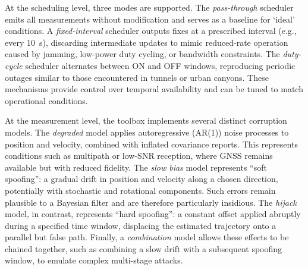 \documentclass[Afour,sageh,times]{sagej}
\begin{document}
At the scheduling level, three modes are supported. The \emph{pass-through} scheduler emits all measurements without modification and serves as a baseline for `ideal' conditions. A \emph{fixed-interval} scheduler outputs fixes at a prescribed interval (e.g., every 10~s), discarding intermediate updates to mimic reduced-rate operation caused by jamming, low-power duty cycling, or bandwidth constraints. The \emph{duty-cycle} scheduler alternates between ON and OFF windows, reproducing periodic outages similar to those encountered in tunnels or urban canyons. These mechanisms provide control over temporal availability and can be tuned to match operational conditions.  

At the measurement level, the toolbox implements several distinct corruption models. The \emph{degraded} model applies autoregressive (AR(1)) noise processes to position and velocity, combined with inflated covariance reports. This represents conditions such as multipath or low-SNR reception, where GNSS remains available but with reduced fidelity. The \emph{slow bias} model represents ``soft spoofing'': a gradual drift in position and velocity along a chosen direction, potentially with stochastic and rotational components. Such errors remain plausible to a Bayesian filter and are therefore particularly insidious. The \emph{hijack} model, in contrast, represents ``hard spoofing'': a constant offset applied abruptly during a specified time window, displacing the estimated trajectory onto a parallel but false path. Finally, a \emph{combination} model allows these effects to be chained together, such as combining a slow drift with a subsequent spoofing window, to emulate complex multi-stage attacks.
\end{document}
